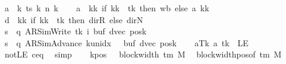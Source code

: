 \begin{isabellebody}
\ {\isacharquery}{\kern0pt}a\ {\isacharequal}{\kern0pt}\ {\isachardoublequoteopen}{\isasymlambda}k{\isachardot}{\kern0pt}\ ts\ k\ {\isacharparenleft}{\kern0pt}n\ k{\isacharparenright}{\kern0pt}{\isachardoublequoteclose}\isanewline
\ \ \isamarkupfalse%
\ {\isacharquery}{\kern0pt}a{\isacharprime}{\kern0pt}\ {\isacharequal}{\kern0pt}\ {\isachardoublequoteopen}{\isasymlambda}kk{\isachardot}{\kern0pt}\ if\ kk\ {\isacharequal}{\kern0pt}\ tk\ then\ {\isacharquery}{\kern0pt}wb\ else\ {\isacharquery}{\kern0pt}a\ kk{\isachardoublequoteclose}\isanewline
\ \ \isamarkupfalse%
\ {\isacharquery}{\kern0pt}d\ {\isacharequal}{\kern0pt}\ {\isachardoublequoteopen}{\isasymlambda}kk{\isachardot}{\kern0pt}\ if\ kk\ {\isacharequal}{\kern0pt}\ tk\ then\ dir{\isachardot}{\kern0pt}R\ else\ dir{\isachardot}{\kern0pt}N{\isachardoublequoteclose}\isanewline
\ \ \isamarkupfalse%
\ {\isacharquery}{\kern0pt}s\ {\isacharequal}{\kern0pt}\ {\isachardoublequoteopen}{\isacharparenleft}{\kern0pt}q{\isacharcomma}{\kern0pt}\ AR{\isacharunderscore}{\kern0pt}SimWrite{\isacharcomma}{\kern0pt}\ tk{\isacharcomma}{\kern0pt}\ i{\isacharcomma}{\kern0pt}\ buf{\isacharcomma}{\kern0pt}\ dvec{\isacharcomma}{\kern0pt}\ posk{\isacharparenright}{\kern0pt}{\isachardoublequoteclose}\isanewline
\ \ \isamarkupfalse%
\ {\isacharquery}{\kern0pt}s{\isacharprime}{\kern0pt}\ {\isacharequal}{\kern0pt}\ {\isachardoublequoteopen}{\isacharparenleft}{\kern0pt}q{\isacharcomma}{\kern0pt}\ AR{\isacharunderscore}{\kern0pt}SimAdvance{\isacharcomma}{\kern0pt}\ k{\isacharunderscore}{\kern0pt}unidx\ {}{\isacharcomma}{\kern0pt}\ {}{\isacharcomma}{\kern0pt}\ buf{\isacharcomma}{\kern0pt}\ dvec{\isacharcomma}{\kern0pt}\ posk{\isacharparenright}{\kern0pt}{\isachardoublequoteclose}\isanewline
\ \ \isamarkupfalse%
\ aTk{\isacharcolon}{\kern0pt}\ {\isachardoublequoteopen}{\isacharquery}{\kern0pt}a\ tk\ {\isasymnoteq}\ LE{}{\isachardoublequoteclose}\ \isamarkupfalse%
\ notLE\ c{\isacharprime}{\kern0pt}{\isacharunderscore}{\kern0pt}eq\ \isamarkupfalse%
\ simp\isanewline
\ \ \isamarkupfalse%
\ kpos{\isacharcolon}{\kern0pt}\ {\isachardoublequoteopen}{}\ {\isacharless}{\kern0pt}\ block{\isacharunderscore}{\kern0pt}width\ {\isacharparenleft}{\kern0pt}{\isasymGamma}{\isacharunderscore}{\kern0pt}tm\ M{\isacharparenright}{\kern0pt}{\isachardoublequoteclose}\ \isamarkupfalse%
\ block{\isacharunderscore}{\kern0pt}width{\isacharunderscore}{\kern0pt}pos{\isacharbrackleft}{\kern0pt}of\ {\isachardoublequoteopen}{\isasymGamma}{\isacharunderscore}{\kern0pt}tm\ M{\isachardoublequoteclose}{\isacharbrackright}{\kern0pt}\ \isamarkupfalse%

\end{isabellebody}

